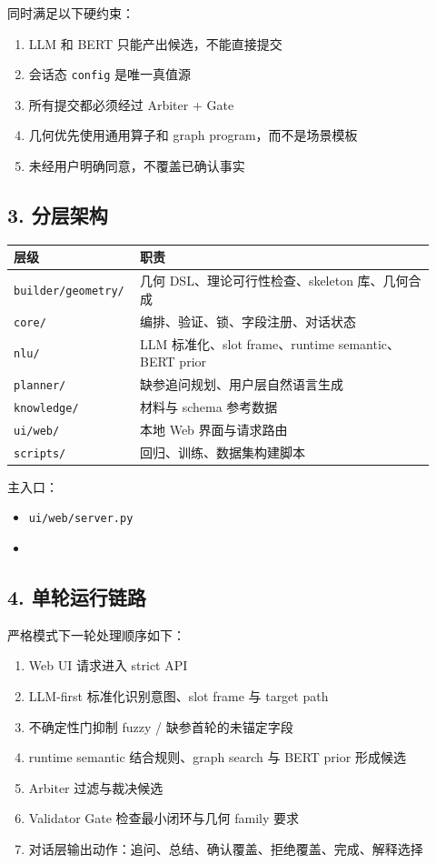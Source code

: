 \documentclass[11pt,a4paper]{ctexart}
\begin{document}
同时满足以下硬约束：

\begin{enumerate}
\item LLM 和 BERT 只能产出候选，不能直接提交
\item 会话态 \texttt{config} 是唯一真值源
\item 所有提交都必须经过 Arbiter + Gate
\item 几何优先使用通用算子和 graph program，而不是场景模板
\item 未经用户明确同意，不覆盖已确认事实
\end{enumerate}

\subsection*{3. 分层架构}

\begin{longtable}{>{\raggedright\arraybackslash}p{0.24\linewidth} >{\raggedright\arraybackslash}p{0.68\linewidth}}
\toprule
层级 & 职责 \\
\midrule
\texttt{builder/geometry/} & 几何 DSL、理论可行性检查、skeleton 库、几何合成 \\
\texttt{core/} & 编排、验证、锁、字段注册、对话状态 \\
\texttt{nlu/} & LLM 标准化、slot frame、runtime semantic、BERT prior \\
\texttt{planner/} & 缺参追问规划、用户层自然语言生成 \\
\texttt{knowledge/} & 材料与 schema 参考数据 \\
\texttt{ui/web/} & 本地 Web 界面与请求路由 \\
\texttt{scripts/} & 回归、训练、数据集构建脚本 \\
\bottomrule
\end{longtable}

主入口：

\begin{itemize}
\item \texttt{ui/web/server.py}
\item {}
\end{itemize}

\subsection*{4. 单轮运行链路}

严格模式下一轮处理顺序如下：

\begin{enumerate}
\item Web UI 请求进入 strict API
\item LLM-first 标准化识别意图、slot frame 与 target path
\item 不确定性门抑制 fuzzy / 缺参首轮的未锚定字段
\item runtime semantic 结合规则、graph search 与 BERT prior 形成候选
\item Arbiter 过滤与裁决候选
\item Validator Gate 检查最小闭环与几何 family 要求
\item 对话层输出动作：追问、总结、确认覆盖、拒绝覆盖、完成、解释选择
\end{enumerate}
\end{document}
